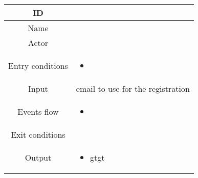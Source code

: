 \begin{longtable}{ | c | p{10cm} | }

    \hline
    ID               &                                                                                                                                                                                                                                                                       \\ \hline
    Name             &                                                                                                                                                                                                                                                 \\
    \hline
    Actor            &                                                                                                                                                                                                                                                                    \\
    \hline
    Entry conditions &
    \begin{itemize}
        \item 
    \end{itemize}
    \\
    \hline

    Input            & email to use for the registration                                                                                                                                                                                                                                      \\ \hline
    Events flow      & \begin{itemize}[nosep,after=\strut]
        \item 

    \end{itemize}                                                                                                                                                                                                                                             \\
    \hline
    Exit conditions  & \\ \hline
    Output           & \begin{itemize}
        \item gtgt


\end{itemize}
\end{longtable}
